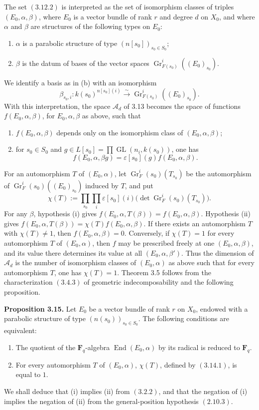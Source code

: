 \documentclass[11pt]{article}
\newcommand{\Fq}{\mathbf F_q}
\newcommand{\End}{\operatorname{End}}
\newcommand{\GL}{\operatorname{GL}}
\newcommand{\Gr}{\operatorname{Gr}}
\begin{document}
The set \((3.12.2)\) is interpreted as the set of isomorphism classes of triples \((E_0,\alpha,\beta)\), where \(E_0\) is a vector bundle of rank \(r\) and degree \(d\) on \(X_0\), and where \(\alpha\) and \(\beta\) are structures of the following types on \(E_0\):
\begin{enumerate}[label=(\alph*)]
\item \(\alpha\) is a parabolic structure of type \((n[s_0])_{s_0\in S_0}\);
\item \(\beta\) is the datum of bases of the vector spaces \(\Gr^i_{F(s_0)}((E_0)_{s_0})\).
\end{enumerate}
We identify a basis as in (b) with an isomorphism
\[
\beta_{s_0,i}:k(s_0)^{n[s_0](i)}\xrightarrow{\sim}\Gr^i_{F(s_0)}((E_0)_{s_0}).
\]
With this interpretation, the space \(\mathcal A_d\) of 3.13 becomes the space of functions \(f(E_0,\alpha,\beta)\), for \(E_0,\alpha,\beta\) as above, such that
\begin{enumerate}[label=(\roman*)]
\item \(f(E_0,\alpha,\beta)\) depends only on the isomorphism class of \((E_0,\alpha,\beta)\);
\item for \(s_0\in S_0\) and \(g\in L[s_0]=\prod\GL(n_i,k(s_0))\), one has
\[
f(E_0,\alpha,\beta g)=\varepsilon[s_0](g)f(E_0,\alpha,\beta).
\]
\end{enumerate}
For an automorphism \(T\) of \((E_0,\alpha)\), let \(\Gr^i_F(s_0)(T_{s_0})\) be the automorphism of \(\Gr^i_F(s_0)((E_0)_{s_0})\) induced by \(T\), and put
\begin{equation}\tag{3.14.1}
\chi(T):=\prod_{s_0}\prod_i \varepsilon[s_0](i)\bigl(\det \Gr^i_F(s_0)(T_{s_0})\bigr).
\end{equation}
For any \(\beta\), hypothesis (i) gives \(f(E_0,\alpha,T(\beta))=f(E_0,\alpha,\beta)\). Hypothesis (ii) gives \(f(E_0,\alpha,T(\beta))=\chi(T)f(E_0,\alpha,\beta)\). If there exists an automorphism \(T\) with \(\chi(T)\ne1\), then \(f(E_0,\alpha,\beta)=0\). Conversely, if \(\chi(T)=1\) for every automorphism \(T\) of \((E_0,\alpha)\), then \(f\) may be prescribed freely at one \((E_0,\alpha,\beta)\), and its value there determines its value at all \((E_0,\alpha,\beta')\). Thus the dimension of \(\mathcal A_d\) is the number of isomorphism classes of \((E_0,\alpha)\) as above such that for every automorphism \(T\), one has \(\chi(T)=1\). Theorem 3.5 follows from the characterization \((3.4.3)\) of geometric indecomposability and the following proposition.

\textbf{Proposition 3.15.} Let \(E_0\) be a vector bundle of rank \(r\) on \(X_0\), endowed with a parabolic structure of type \((n(s_0))_{s_0\in S_0}\). The following conditions are equivalent:
\begin{enumerate}[label=(\roman*)]
\item The quotient of the \(\Fq\)-algebra \(\End(E_0,\alpha)\) by its radical is reduced to \(\Fq\).
\item For every automorphism \(T\) of \((E_0,\alpha)\), \(\chi(T)\), defined by \((3.14.1)\), is equal to \(1\).
\end{enumerate}
We shall deduce that (i) implies (ii) from \((3.2.2)\), and that the negation of (i) implies the negation of (ii) from the general-position hypothesis \((2.10.3)\).
\end{document}
